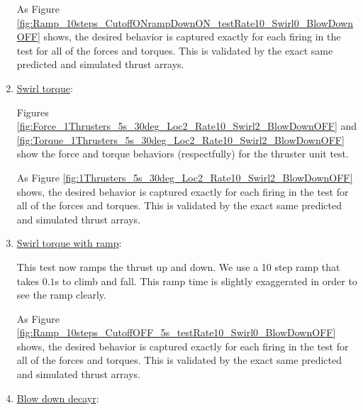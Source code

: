 \begin{enumerate}
	

	As Figure \ref{fig:Ramp_10steps_CutoffONrampDownON_testRate10_Swirl0_BlowDownOFF} shows, the desired behavior is captured exactly for each
	firing in the test for all of the forces and torques. This is validated by the exact same predicted and simulated thrust arrays.

	\item{\underline{Swirl torque}:}

	

	Figures \ref{fig:Force_1Thrusters_5s_30deg_Loc2_Rate10_Swirl2_BlowDownOFF} and \ref{fig:Torque_1Thrusters_5s_30deg_Loc2_Rate10_Swirl2_BlowDownOFF} show the force and torque behaviors (respectfully) for the thruster unit test.

	
	
	

	As Figure \ref{fig:1Thrusters_5s_30deg_Loc2_Rate10_Swirl2_BlowDownOFF} shows, the desired behavior is captured exactly for each
	firing in the test for all of the forces and torques. This is validated by the exact same predicted and simulated thrust arrays.

	\item{\underline{Swirl torque with ramp}:}

	

	This test now ramps the thrust up and down. We use a 10 step ramp that takes $0.1$s to climb and fall. This ramp time is slightly exaggerated in order to see the ramp clearly.
	

	As Figure \ref{fig:Ramp_10steps_CutoffOFF_5s_testRate10_Swirl0_BlowDownOFF} shows, the desired behavior is captured exactly for each
	firing in the test for all of the forces and torques. This is validated by the exact same predicted and simulated thrust arrays.

	\item{\underline{Blow down decayr}:}

	


\end{enumerate}
